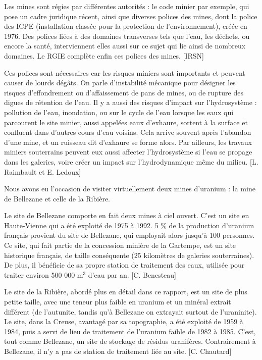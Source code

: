 \documentclass{article}
\begin{document}
Les mines sont régies par différentes autorités : le code minier par exemple, qui pose un cadre juridique récent, ainsi que diverses polices des mines, dont la police des ICPE (installation classée pour la protection de l’environnement), créée en 1976. Des polices liées à des domaines transverses tels que l’eau, les déchets, ou encore la santé, interviennent elles aussi sur ce sujet qui lie ainsi de nombreux domaines. Le RGIE complète enfin ces polices des mines. [IRSN]

Ces polices sont nécessaires car les risques miniers sont importants et peuvent causer de lourds dégâts. On parle d’instabilité mécanique pour désigner les risques d’effondrement ou d’affaissement de pans de mines, ou de rupture des digues de rétention de l’eau. Il y a aussi des risques d’impact sur l’hydrosystème : pollution de l’eau, inondation, ou sur le cycle de l’eau lorsque les eaux qui parcourent le site minier, aussi appelées eaux d’exhaure, sortent à la surface et confluent dans d’autres cours d’eau voisins. Cela arrive souvent après l’abandon d’une mine, et un ruisseau dit d’exhaure se forme alors. Par ailleurs, les travaux miniers souterrains peuvent eux aussi affecter l’hydrosystème si l’eau se propage dans les galeries, voire créer un impact sur l’hydrodynamique même du milieu. [L. Raimbault et E. Ledoux]

Nous avons eu l’occasion de visiter virtuellement deux mines d’uranium : la mine de Bellezane et celle de la Ribière. 

Le site de Bellezane comporte en fait deux mines à ciel ouvert. C’est un site en Haute-Vienne qui a été exploité de 1975 à 1992. 5 \% de la production d’uranium français provient du site de Bellezane, qui employait alors jusqu’à 100 personnes. Ce site, qui fait partie de la concession minière de la Gartempe, est un site historique français, de taille conséquente (25 kilomètres de galeries souterraines). De plus, il bénéficie de sa propre station de traitement des eaux, utilisée pour traiter environ 500 000 $\text{m}^3$ d’eau par an. [C. Benesteau]

Le site de la Ribière, abordé plus en détail dans ce rapport, est un site de plus petite taille, avec une teneur plus faible en uranium et un minéral extrait différent (de l’autunite, tandis qu’à Bellezane on extrayait surtout de l’uraninite). Le site, dans la Creuse, avantagé par sa topographie, a été exploité de 1959 à 1984, puis a servi de lieu de traitement de l’uranium faible de 1982 à 1985. C’est, tout comme Bellezane, un site de stockage de résidus uranifères. Contrairement à Bellezane, il n’y a pas de station de traitement liée au site. [C. Chautard]
\end{document}
